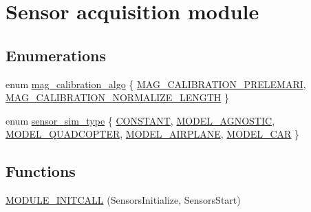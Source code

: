\hypertarget{group___sensors}{\section{\-Sensor acquisition module}
\label{group___sensors}
}
\subsection*{\-Enumerations}
\begin{DoxyCompactItemize}
\item 
enum \hyperlink{group___sensors_gaa4a9d2444da0ad9373dc8d8fc3d851c8}{mag\-\_\-calibration\-\_\-algo} \{ \hyperlink{group___sensors_ggaa4a9d2444da0ad9373dc8d8fc3d851c8acb8ba365d61808f93588f4f6ab773121}{\-M\-A\-G\-\_\-\-C\-A\-L\-I\-B\-R\-A\-T\-I\-O\-N\-\_\-\-P\-R\-E\-L\-E\-M\-A\-R\-I}, 
\hyperlink{group___sensors_ggaa4a9d2444da0ad9373dc8d8fc3d851c8a566b052171d9d352158b7d7652b4280a}{\-M\-A\-G\-\_\-\-C\-A\-L\-I\-B\-R\-A\-T\-I\-O\-N\-\_\-\-N\-O\-R\-M\-A\-L\-I\-Z\-E\-\_\-\-L\-E\-N\-G\-T\-H}
 \}
\item 
enum \hyperlink{group___sensors_ga6423b17c1c5cfe30ec2b9cabedc03f70}{sensor\-\_\-sim\-\_\-type} \{ \*
\hyperlink{group___sensors_gga6423b17c1c5cfe30ec2b9cabedc03f70a83972670b57415508523b5641bb46116}{\-C\-O\-N\-S\-T\-A\-N\-T}, 
\hyperlink{group___sensors_gga6423b17c1c5cfe30ec2b9cabedc03f70a7960fc19ecff58403fe8ce9aff5254a8}{\-M\-O\-D\-E\-L\-\_\-\-A\-G\-N\-O\-S\-T\-I\-C}, 
\hyperlink{group___sensors_gga6423b17c1c5cfe30ec2b9cabedc03f70af0e5a574aa71ec14e1b4d7288086995c}{\-M\-O\-D\-E\-L\-\_\-\-Q\-U\-A\-D\-C\-O\-P\-T\-E\-R}, 
\hyperlink{group___sensors_gga6423b17c1c5cfe30ec2b9cabedc03f70a760a21ed021ec46ff7bbff4846bc7064}{\-M\-O\-D\-E\-L\-\_\-\-A\-I\-R\-P\-L\-A\-N\-E}, 
\*
\hyperlink{group___sensors_gga6423b17c1c5cfe30ec2b9cabedc03f70ab7b5347f7118bc133ff0b6dddd3b0cf4}{\-M\-O\-D\-E\-L\-\_\-\-C\-A\-R}
 \}
\end{DoxyCompactItemize}
\subsection*{\-Functions}
\begin{DoxyCompactItemize}
\item 
\hyperlink{group___sensors_gad752fb91759736ace8a33f3994a6ddbc}{\-M\-O\-D\-U\-L\-E\-\_\-\-I\-N\-I\-T\-C\-A\-L\-L} (\-Sensors\-Initialize, \-Sensors\-Start)
\end{DoxyCompactItemize}
